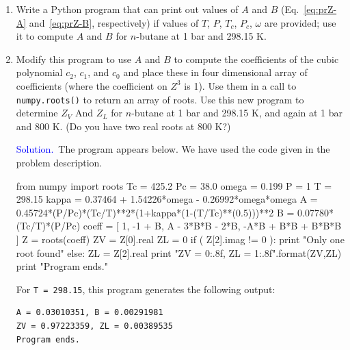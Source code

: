 \documentclass[11pt]{article}
\newif \ifshowsolutions
\begin{document}
\begin{enumerate}
\item Write a Python program that can print out values of $A$ and $B$ (Eq.~\ref{eq:prZ-A} and~\ref{eq:prZ-B}, respectively) if values of $T$, $P$, $T_c$, $P_c$, $\omega$ are provided; use it to compute $A$ and $B$ for $n$-butane at 1 bar and 298.15 K.

\ifshowsolutions
\textcolor{blue}{Solution.}  The program appears below. 

\begin{python}
Tc = 425.2
Pc = 38.0
omega = 0.199
P = 1
T = 298.15
kappa = 0.37464 + 1.54226*omega - 0.26992*omega*omega
A = 0.45724*(P/Pc)*(Tc/T)**2*(1+kappa*(1-(T/Tc)**(0.5)))**2
B = 0.07780*(Tc/T)*(P/Pc)
print "A = {0:.8f}, B = {1:.8f}".format(A,B)
print "Program ends."
\end{python}
This program produces the following output:
\begin{verbatim}
A = 0.03010351, B = 0.00291981
Program ends.
\end{verbatim}
\clearpage
\fi

\item Modify this program to use $A$ and $B$ to compute the coefficients of the cubic polynomial $c_2$, $c_1$, and $c_0$ and place these in four dimensional array of coefficients (where the coefficient on $Z^3$ is 1).  Use them in a call to {\tt numpy.roots()} to return an array of roots.  Use this new program to determine $Z_V$ And $Z_L$ for $n$-butane at 1 bar and 298.15 K, and again at 1 bar and 800 K.  (Do you have two real roots at 800 K?)

\ifshowsolutions
\textcolor{blue}{Solution.}\  The program appears below.  We have used the code given in the problem description.
\begin{python}
from numpy import roots
Tc = 425.2
Pc = 38.0
omega = 0.199
P = 1
T = 298.15
kappa = 0.37464 + 1.54226*omega - 0.26992*omega*omega
A = 0.45724*(P/Pc)*(Tc/T)**2*(1+kappa*(1-(T/Tc)**(0.5)))**2
B = 0.07780*(Tc/T)*(P/Pc)
coeff = [ 1, -1 + B, A - 3*B*B - 2*B, -A*B + B*B + B*B*B ]
Z = roots(coeff)
ZV = Z[0].real
ZL = 0
if ( Z[2].imag != 0 ):
   print "Only one root found"
else:
   ZL = Z[2].real
print "ZV = {0:.8f}, ZL = {1:.8f}".format(ZV,ZL)
print "Program ends."
\end{python}

For {\tt T = 298.15}, this program generates the following output:
\begin{verbatim}
A = 0.03010351, B = 0.00291981
ZV = 0.97223359, ZL = 0.00389535
Program ends.
\end{verbatim}


\end{enumerate}
\end{document}
